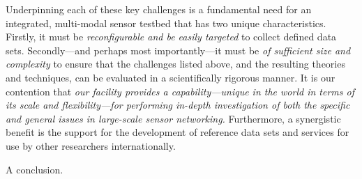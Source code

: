 \documentclass[times,10pt,twocolumn]{article}
\begin{document}
Underpinning each of these key challenges is a fundamental need for an
integrated, multi-modal sensor testbed that has two unique
characteristics. Firstly, it must be \emph{reconfigurable and be
  easily targeted} to collect defined data sets.  Secondly---and
perhaps most importantly---it must be \emph{of sufficient size and
  complexity} to ensure that the challenges listed above, and the
resulting theories and techniques, can be evaluated in a
scientifically rigorous manner.  It is our contention that \emph{our
  facility provides a capability---unique in the world in terms of its
  scale and flexibility---for performing in-depth investigation of
  both the specific and general issues in large-scale sensor
  networking.}  Furthermore, a synergistic benefit is the support for
the development of reference data sets and services for use by other
researchers internationally.


A conclusion.




\end{document}
